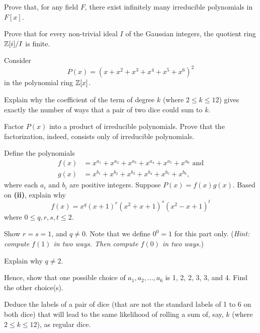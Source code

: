 \begin{problem}
    Prove that, for any field $F$, there exist infinitely many irreducible polynomials in $F[x]$.
\end{problem}

\begin{problem}
    Prove that for every non-trivial ideal $I$ of the Gaussian integers, the quotient ring $\mathbb{Z}[i]/I$ is finite.
\end{problem}

\newpage

\begin{problem}
    Consider
    \[
        P(x) = (x + x^2 + x^3 + x^4 + x^5 + x^6)^2
    \]
    in the polynomial ring $\mathbb{Z}[x]$.
    \begin{partquestions}{\roman*}
        \item Explain why the coefficient of the term of degree $k$ (where $2 \leq k \leq 12$) gives exactly the number of ways that a pair of two dice could sum to $k$.
        
        \item Factor $P(x)$ into a product of irreducible polynomials. Prove that the factorization, indeed, consists only of irreducible polynomials.
        
        \item Define the polynomials
        \begin{align*}
            f(x) &= x^{a_1} + x^{a_2} + x^{a_3} + x^{a_4} + x^{a_5} + x^{a_6} \text{ and}\\
            g(x) &= x^{b_1} + x^{b_2} + x^{b_3} + x^{b_4} + x^{b_5} + x^{b_6},
        \end{align*}
        where each $a_i$ and $b_i$ are positive integers. Suppose $P(x) = f(x)g(x)$. Based on \textbf{(ii)}, explain why
        \[
            f(x) = x^q(x+1)^r(x^2+x+1)^s(x^2-x+1)^t
        \]
        where $0 \leq q,r,s,t \leq 2$.

        \item Show $r = s = 1$, and $q \neq 0$. Note that we define $0^0 = 1$ for this part only.\newline
        (\textit{Hint: compute $f(1)$ in two ways. Then compute $f(0)$ in two ways.})

        \item Explain why $q \neq 2$.
        
        \item Hence, show that one possible choice of $a_1, a_2, \dots, a_6$ is 1, 2, 2, 3, 3, and 4. Find the other choice(s).
        
        \item Deduce the labels of a pair of dice (that are not the standard labels of 1 to 6 on both dice) that will lead to the same likelihood of rolling a sum of, say, $k$ (where $2 \leq k \leq 12$), as regular dice.
    \end{partquestions}
\end{problem}
